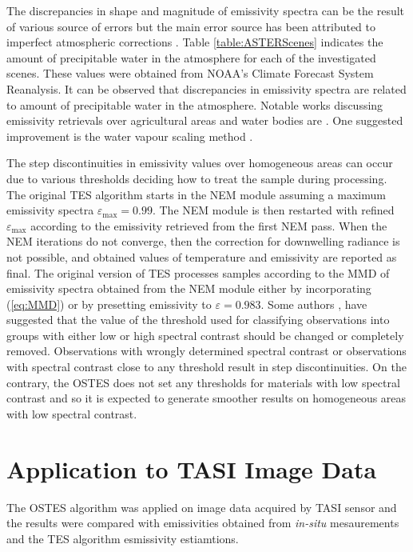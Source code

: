 The discrepancies in shape and magnitude of emissivity spectra can be the result of various source of errors but the main error source has been attributed to imperfect atmospheric corrections \cite{TP01, TP05}. Table \ref{table:ASTERScenes} indicates the amount of precipitable water in the atmosphere for each of the investigated scenes. These values were obtained from NOAA's Climate Forecast System Reanalysis. It can be observed that discrepancies in emissivity spectra are related to amount of precipitable water in the atmosphere. Notable works discussing emissivity retrievals over agricultural areas and water bodies are \cite{CC07, SJ07}. One suggested improvement is the water vapour scaling method \cite{T05, GA11}.

The step discontinuities in emissivity values over homogeneous areas can occur due to various thresholds deciding how to treat the sample during processing. The original TES algorithm starts in the NEM module assuming a maximum emissivity spectra $\varepsilon_\mathrm{max}=0.99$. The NEM module is then restarted with refined $\varepsilon_\mathrm{max}$ according to the emissivity retrieved from the first NEM pass. When the NEM iterations do not converge, then the correction for downwelling radiance is not possible, and obtained values of temperature and emissivity are reported as final. The original version of TES processes samples according to the MMD of emissivity spectra obtained from the NEM module either by incorporating (\ref{eq:MMD}) or by presetting emissivity to $\varepsilon = 0.983$. Some authors \cite{GG06}, \cite{SG09} have suggested that the value of the threshold used for classifying observations into groups with either low or high spectral contrast should be changed or completely removed. Observations with wrongly determined spectral contrast or observations with spectral contrast close to any threshold result in step discontinuities. On the contrary, the OSTES does not set any thresholds for materials with low spectral contrast and so it is expected to generate smoother results on homogeneous areas with low spectral contrast.

\section{Application to TASI Image Data}

The OSTES algorithm was applied on image data acquired by TASI sensor and the results were compared with emissivities obtained from \textit{in-situ} mesaurements and the TES algorithm esmissivity estiamtions. 

